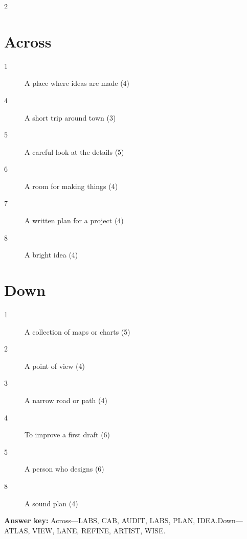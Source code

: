 \documentclass[a4paper]{article}
\begin{document}
\vspace{7pt}
\begin{multicols}{2}
\section*{Across}
\begin{description}
  \item[1] A place where ideas are made (4)
  \item[4] A short trip around town (3)
  \item[5] A careful look at the details (5)
  \item[6] A room for making things (4)
  \item[7] A written plan for a project (4)
  \item[8] A bright idea (4)
\end{description}
\columnbreak
\section*{Down}
\begin{description}
  \item[1] A collection of maps or charts (5)
  \item[2] A point of view (4)
  \item[3] A narrow road or path (4)
  \item[4] To improve a first draft (6)
  \item[5] A person who designs (6)
  \item[8] A sound plan (4)
\end{description}
\end{multicols}
\vfill
\noindent\small\textbf{Answer key:} Across—LABS, CAB, AUDIT, LABS, PLAN, IDEA.\quad Down—ATLAS, VIEW, LANE, REFINE, ARTIST, WISE.
\end{document}
